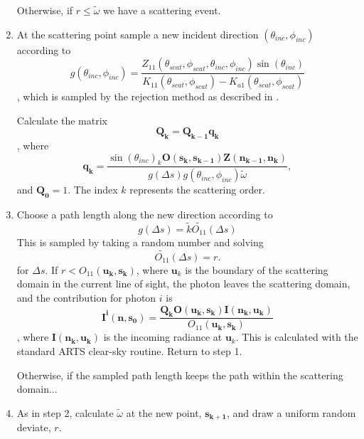 \begin{enumerate}
Otherwise, if $r\le\tilde{\omega}$
we have a scattering event.
\item
At the scattering point sample a new incident direction
  $(\theta_{inc},\phi_{inc})$ according to 
\begin{equation}
g(\theta_{inc},\phi_{inc})=\frac{Z_{11}(\theta_{scat},\phi_{scat},
\theta_{inc},\phi_{inc})\sin(\theta_{inc})}{K_{11}(\theta_{scat},\phi_{scat})
  - K_{a1}(\theta_{scat},\phi_{scat})}
\label{gdir}
\end{equation}
, which is
sampled by the rejection method as described in \cite{liu:01}.

Calculate the matrix
\begin{equation}
\mathbf{Q_k}=\mathbf{Q_{k-1}q_k}
\label{Q}
\end{equation}
, where
\begin{equation}
\mathbf{q_k}=\frac{\sin(\theta_{inc})_k
  \mathbf{O(s_k,s_{k-1})}\mathbf{Z(n_{k-1},n_k)}}
  {g\left(\Delta s\right)g(\theta_{inc},\phi_{inc}) \tilde{\omega}} ,
\label{q}
\end{equation}
and $\mathbf{Q_0}={1}$. The index $k$ represents the
scattering order.
\item
Choose a path length along the new direction according to
\begin{equation}
g(\Delta s)=\tilde{k}\tilde{O_{11}}(\Delta s)
\label{gDeltas}
\end{equation}
This is sampled by taking a random number and solving 
\begin{equation}
\tilde{O_{11}}(\Delta s)=r.
\end{equation}
for $\Delta s$.
If $r<O_{11}(\mathbf{u_{k},s_k})$, where $\mathbf{u}_{k}$ is the
  boundary of the scattering domain in the current line of sight, the
  photon leaves the scattering domain, and the contribution for photon $i$ is
\begin{equation}
\mathbf{I^i(n,s_0)}=\frac{\mathbf{Q_k}\mathbf{O(u_k,s_k)I(n_k,u_k)}}{O_{11}(\mathbf{u_{k},s_k})}
\label{Ikmax2_1}
\end{equation}
, where 
$\mathbf{I(n_k,u_k)}$ is the incoming radiance at $\mathbf{u}_{k}$.  This is calculated with the standard ARTS clear-sky
routine. Return to step 1.

Otherwise, if the sampled path length keeps the path within the
scattering domain...
\item
As in step 2, calculate 
$\tilde{\omega}$ at the new point, $\mathbf{s_{k+1}}$, and draw a uniform
  random deviate, $r$.


\end{enumerate}
